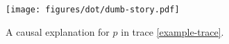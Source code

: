 \begin{figure}[H]
  \vskip -0.8cm
  \begin{center}
    \texttt{[image: figures/dot/dumb-story.pdf]}
  \end{center}
  \vskip -1cm
  \caption{A causal explanation for $p$ in trace \ref{example-trace}.}
  \label{fig:dumb-story}
\end{figure}
